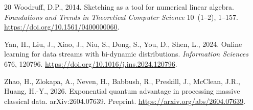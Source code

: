 \documentclass[preprint,12pt,authoryear]{elsarticle}
\begin{document}
\begin{thebibliography}{20}
Woodruff, D.P., 2014.
\newblock Sketching as a tool for numerical linear algebra.
\newblock \emph{Foundations and Trends in Theoretical Computer Science} 10~(1--2), 1--157.
\newblock \url{https://doi.org/10.1561/0400000060}.

Yan, H., Liu, J., Xiao, J., Niu, S., Dong, S., You, D., Shen, L., 2024.
\newblock Online learning for data streams with bi-dynamic distributions.
\newblock \emph{Information Sciences} 676, 120796.
\newblock \url{https://doi.org/10.1016/j.ins.2024.120796}.

Zhao, H., Zlokapa, A., Neven, H., Babbush, R., Preskill, J., McClean, J.R., Huang, H.-Y., 2026.
\newblock Exponential quantum advantage in processing massive classical data.
\newblock arXiv:2604.07639. Preprint.
\newblock \url{https://arxiv.org/abs/2604.07639}.

\end{thebibliography}
\end{document}
